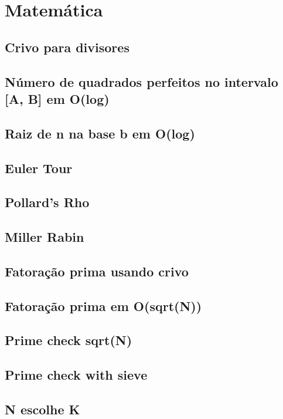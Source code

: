 \section{Matemática}

\subsection{Crivo para divisores}


\subsection{Número de quadrados perfeitos no intervalo [A, B] em O(log)}


\subsection{Raiz de n na base b em O(log)}


\subsection{Euler Tour}


\subsection{Pollard's Rho}


\subsection{Miller Rabin}


\subsection{Fatoração prima usando crivo}


\subsection{Fatoração prima em O(sqrt(N))}


\subsection{Prime check sqrt(N)}


\subsection{Prime check with sieve}


\subsection{N escolhe K}
